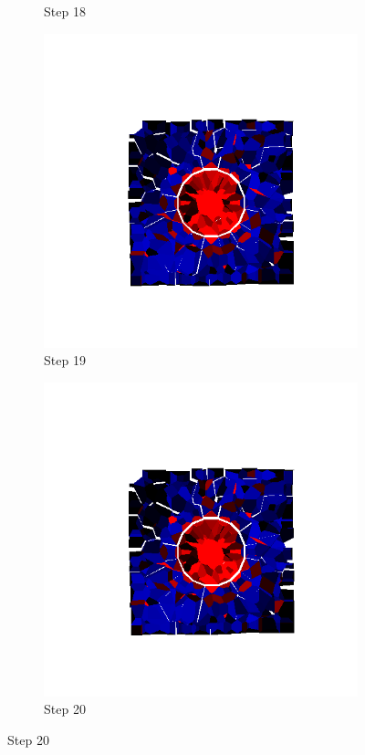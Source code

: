 \begin{figure}[ht!]
\begin{subfigure}{.25\textwidth}
      \caption{Step 18}
      \end{subfigure}%
      \begin{subfigure}{.25\textwidth}
        \centering
        \includegraphics[width=1.0\linewidth]{Files/Small_ASR/IS/DEP5-STEP(019).png}
      \caption{Step 19}
      \end{subfigure}%
      \begin{subfigure}{.25\textwidth}
        \centering
        \includegraphics[width=1.0\linewidth]{Files/Small_ASR/IS/DEP5-STEP(020).png}
      \caption{Step 20}
      \end{subfigure}


\end{figure}
